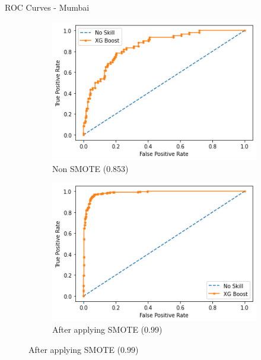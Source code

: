\documentclass[11pt]{beamer}
\begin{document}
\begin{frame}{ROC Curves - Mumbai}
\begin{figure}[!h]
\begin{subfigure}{.5\textwidth}
\centering
\includegraphics[width=.8\linewidth]{mumbai_normal.png}
\caption{Non SMOTE (0.853)}
\end{subfigure}%
\begin{subfigure}{.5\textwidth}
\centering
\includegraphics[width=.8\linewidth]{mumbai_smote.png}
\caption{After applying SMOTE (0.99)}
\end{subfigure}
\end{figure}
\end{frame}
\end{document}

